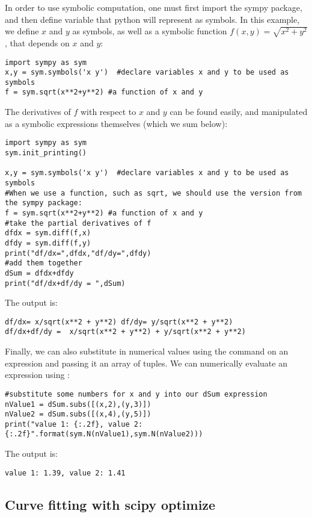 In order to use symbolic computation, one must first import the sympy package, and then define variable that python will represent as symbols. In this example, we define $x$ and $y$ as symbols, as well as a symbolic function $f(x,y)=\sqrt{x^2+y^2}$, that depends on $x$ and $y$:

\begin{lstlisting}[frame=single] 
import sympy as sym
x,y = sym.symbols('x y')  #declare variables x and y to be used as symbols
f = sym.sqrt(x**2+y**2) #a function of x and y
\end{lstlisting}

The derivatives of $f$ with respect to $x$ and $y$ can be found easily, and manipulated as a symbolic expressions themselves (which we sum below):
\begin{lstlisting}[frame=single] 
import sympy as sym
sym.init_printing()

x,y = sym.symbols('x y')  #declare variables x and y to be used as symbols
#When we use a function, such as sqrt, we should use the version from the sympy package:
f = sym.sqrt(x**2+y**2) #a function of x and y
#take the partial derivatives of f
dfdx = sym.diff(f,x)
dfdy = sym.diff(f,y)
print("df/dx=",dfdx,"df/dy=",dfdy)
#add them together
dSum = dfdx+dfdy
print("df/dx+df/dy = ",dSum)
\end{lstlisting}
The output is:
\begin{verbatim}
df/dx= x/sqrt(x**2 + y**2) df/dy= y/sqrt(x**2 + y**2)
df/dx+df/dy =  x/sqrt(x**2 + y**2) + y/sqrt(x**2 + y**2)
\end{verbatim}

Finally, we can also substitute in numerical values using the  command on an expression and passing it an array of tuples. We can numerically evaluate an expression using :
\begin{lstlisting}[frame=single] 
#substitute some numbers for x and y into our dSum expression
nValue1 = dSum.subs([(x,2),(y,3)])
nValue2 = dSum.subs([(x,4),(y,5)])
print("value 1: {:.2f}, value 2: {:.2f}".format(sym.N(nValue1),sym.N(nValue2)))
\end{lstlisting}
The output is:
\begin{verbatim}
value 1: 1.39, value 2: 1.41
\end{verbatim}

\subsection{Curve fitting with scipy optimize}

